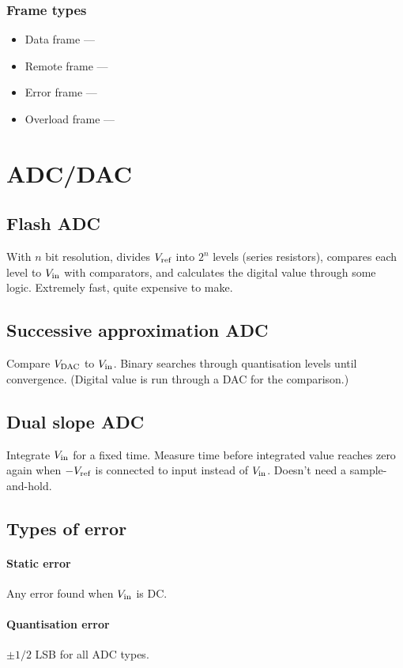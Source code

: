\documentclass[a4paper, 12pt]{article}
\newcommand{\sub}[1]{_{\textup{\scriptsize #1}}}
\begin{document}
\subsubsection{Frame types}
\begin{itemize}[noitemsep]
\item Data frame ---
\item Remote frame ---
\item Error frame ---
\item Overload frame ---
\end{itemize}



\section{ADC/DAC}
\subsection{Flash ADC}
With $n$ bit resolution, divides $V\sub{ref}$ into $2^n$ levels (series resistors), compares each level to $V\sub{in}$ with comparators, and calculates the digital value through some logic. Extremely fast, quite expensive to make.
\subsection{Successive approximation ADC}
Compare $V\sub{DAC}$ to $V\sub{in}$. Binary searches through quantisation levels until convergence. (Digital value is run through a DAC for the comparison.)
\subsection{Dual slope ADC} Integrate $V\sub{in}$ for a fixed time. Measure time before integrated value reaches zero again when $-V\sub{ref}$ is connected to input instead of $V\sub{in}$. Doesn't need a sample-and-hold.
\subsection{Types of error}
\paragraph{Static error} Any error found when $V\sub{in}$ is DC.
\paragraph{Quantisation error} $\pm 1/2$ LSB for all ADC types.
\end{document}
